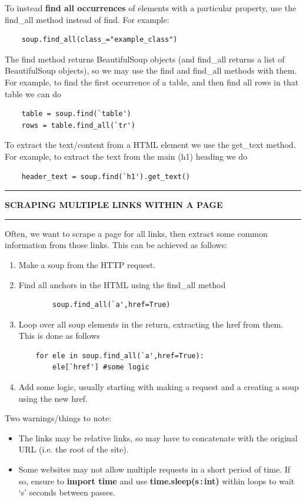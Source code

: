 \documentclass[8pt]{extarticle}
\newcommand{\heading}[1]{%
    \noindent
    \rule{\linewidth}{0.4pt}
    \begin{center}
        \vspace{-1ex}
        \textbf{#1}        
        \vspace{-2.5ex}
    \end{center}
    \rule{\linewidth}{0.4pt}
}
\begin{document}
\begin{multicols}{3}
To instead \textbf{find all occurrences} of elements with a particular property, use the find\_all method instead of find. For example:
\begin{lstlisting}
    soup.find_all(class_="example_class")
\end{lstlisting}

The find method returns BeautifulSoup objects (and find\_all returns a list of BeautifulSoup objects), so we may use the find and find\_all methods with them.\\
For example, to find the first occurrence of a table, and then find all rows in that table we can do 
\begin{lstlisting}
    table = soup.find(`table')
    rows = table.find_all(`tr')
\end{lstlisting}

To extract the text/content from a HTML element we use the get\_text method. For example, to extract the text from the main (h1) heading we do

\begin{lstlisting}
    header_text = soup.find(`h1').get_text()
\end{lstlisting}

\heading{SCRAPING MULTIPLE LINKS WITHIN A PAGE}

Often, we want to scrape a page for all links, then extract some common information from those links. This can be achieved as follows:
\begin{enumerate}
    \item Make a soup from the HTTP request.
    \item Find all anchors in the HTML using the find\_all method
    \begin{lstlisting}
        soup.find_all(`a',href=True)
    \end{lstlisting}
    \item Loop over all soup elements in the return, extracting the href from them. This is done as follows    
    \begin{lstlisting}
    for ele in soup.find_all(`a',href=True):
        ele[`href'] #some logic
    \end{lstlisting}
    \item Add some logic, usually starting with making a request and a creating a soup using the new href.
\end{enumerate}

Two warnings/things to note:
\begin{itemize}
    \item The links may be relative links, so may have to concatenate with the original URL (i.e. the root of the site).
    \item Some websites may not allow multiple requests in a short period of time. If so, ensure to \textbf{import time} and use \textbf{time.sleep(s\,:\,int)} within loops to wait `s' seconds between passes.
\end{itemize}


\end{multicols}
\end{document}
